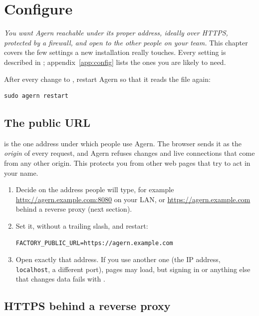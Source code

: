 \chapter{Configure}\label{ch:configure}

\emph{You want Agern reachable under its proper address, ideally over HTTPS, protected by a
firewall, and open to the other people on your team.} This chapter covers the few settings a new
installation really touches. Every setting is described in
;
appendix~\ref{app:config} lists the ones you are likely to need.

After every change to , restart Agern so that it reads the file again:
\begin{lstlisting}
sudo agern restart
\end{lstlisting}

\section{The public URL}\label{sec:public-url}

 is the one address under which people use Agern. The browser sends
it as the \emph{origin} of every request, and Agern refuses changes and live connections that come
from any other origin. This protects you from other web pages that try to act in your name.

\begin{enumerate}
  \item Decide on the address people will type, for example \url{http://agern.example.com:8080}
    on your LAN, or \url{https://agern.example.com} behind a reverse proxy (next section).
  \item Set it, without a trailing slash, and restart:
\begin{lstlisting}[style=conf]
FACTORY_PUBLIC_URL=https://agern.example.com
\end{lstlisting}
  \item Open exactly that address. If you use another one (the IP address, \texttt{localhost}, a
    different port), pages may load, but signing in or anything else that changes data fails with
    .
\end{enumerate}

\section{HTTPS behind a reverse proxy}\label{sec:https}

